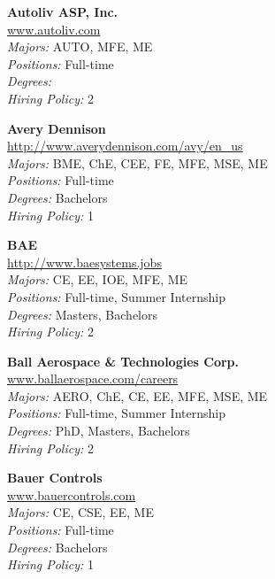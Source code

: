 \documentclass[twoside]{article}
\begin{document}
\begin{center}
\begin{multicols}{3}
\begin{minipage}{.9\columnwidth}{\Large\bf Autoliv ASP, Inc. }\\
	\url{www.autoliv.com}\\
	\emph{Majors:} AUTO, MFE, ME\\
	\emph{Positions:} Full-time\\
	\emph{Degrees:} \\
	\emph{Hiring Policy:} 2\\
\end{minipage}
 
\begin{minipage}{.9\columnwidth}{\Large\bf Avery Dennison }\\
	\url{http://www.averydennison.com/avy/en_us}\\
	\emph{Majors:} BME, ChE, CEE, FE, MFE, MSE, ME\\
	\emph{Positions:} Full-time\\
	\emph{Degrees:} Bachelors\\
	\emph{Hiring Policy:} 1\\
\end{minipage}
 
\begin{minipage}{.9\columnwidth}{\Large\bf BAE }\\
	\url{http://www.baesystems.jobs}\\
	\emph{Majors:} CE, EE, IOE, MFE, ME\\
	\emph{Positions:} Full-time, Summer Internship\\
	\emph{Degrees:} Masters, Bachelors\\
	\emph{Hiring Policy:} 2\\
\end{minipage}
 
\begin{minipage}{.9\columnwidth}{\Large\bf Ball Aerospace \& Technologies Corp. }\\
	\url{www.ballaerospace.com/careers}\\
	\emph{Majors:} AERO, ChE, CE, EE, MFE, MSE, ME\\
	\emph{Positions:} Full-time, Summer Internship\\
	\emph{Degrees:} PhD, Masters, Bachelors\\
	\emph{Hiring Policy:} 2\\
\end{minipage}
 
\begin{minipage}{.9\columnwidth}{\Large\bf Bauer Controls }\\
	\url{www.bauercontrols.com}\\
	\emph{Majors:} CE, CSE, EE, ME\\
	\emph{Positions:} Full-time\\
	\emph{Degrees:} Bachelors\\
	\emph{Hiring Policy:} 1\\
\end{minipage}
 

\end{multicols}
\end{center}
\end{document}
